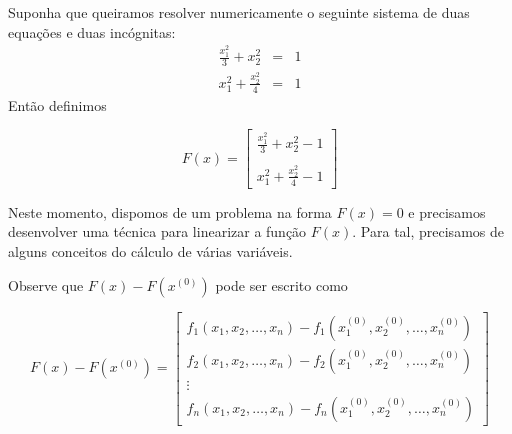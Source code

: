 \begin{ex} Suponha que queiramos resolver numericamente o seguinte sistema de duas equações e duas incógnitas:
\begin{eqnarray*}
\frac{x_1^2}{3}+x_2^2&=&1\\
x_1^2+\frac{x_2^2}{4}&=&1
\end{eqnarray*}
Então definimos

$$F(x)=\left[
\begin{array}{c}
\frac{x_1^2}{3}+x_2^2-1\\~\\
x_1^2+\frac{x_2^2}{4}-1
\end{array}
\right]$$
\end{ex}
Neste momento, dispomos de um problema na forma $F(x)=0$ e precisamos desenvolver uma técnica para linearizar a função $F(x)$. Para tal, precisamos de alguns conceitos do cálculo de várias variáveis.

Observe que $F(x)-F(x^{(0)})$ pode ser escrito como

$$F(x)-F(x^{(0)})=\left[
\begin{array}{c}
f_1(x_1,x_2,\ldots,x_n)-f_1(x_1^{(0)},x_2^{(0)},\ldots,x_n^{(0)})\\
f_2(x_1,x_2,\ldots,x_n)-f_2(x_1^{(0)},x_2^{(0)},\ldots,x_n^{(0)})\\
\vdots\\
f_n(x_1,x_2,\ldots,x_n)-f_n(x_1^{(0)},x_2^{(0)},\ldots,x_n^{(0)})
\end{array}
\right]$$


